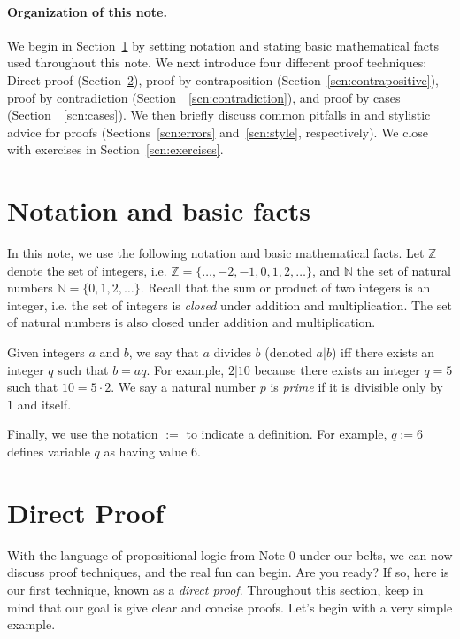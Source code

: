 \documentclass[11pt]{article}
\begin{document}
\paragraph{Organization of this note.} We begin in Section~\ref{scn:facts} by setting notation and stating basic mathematical facts used throughout this note. We next introduce four different proof techniques: Direct proof (Section~\ref{scn:direct}), proof by contraposition (Section~\ref{scn:contrapositive}), proof by contradiction (Section~~\ref{scn:contradiction}), and proof by cases (Section~~\ref{scn:cases}). We then briefly discuss common pitfalls in and stylistic advice for proofs (Sections~\ref{scn:errors} and~\ref{scn:style}, respectively). We close with exercises in Section~\ref{scn:exercises}.

\section{Notation and basic facts}\label{scn:facts}
In this note, we use the following notation and basic mathematical facts. Let $\mathbb{Z}$ denote the set of integers, i.e. $\mathbb{Z}=\{\ldots,-2,-1,0,1,2,\ldots\}$, and $\mathbb{N}$ the set of natural numbers $\mathbb{N}=\{0,1,2,\ldots\}$. Recall that the sum or product of two integers is an integer, i.e. the set of integers is \emph{closed} under addition and multiplication. The set of natural numbers is also closed under addition and multiplication.

Given integers $a$ and $b$, we say that $a$ divides $b$ (denoted $a | b$) iff there exists an integer $q$ such that $b=aq$. For example, $2 | 10$ because there exists an integer $q=5$ such that $10=5\cdot 2$. We say a natural number $p$ is \emph{prime} if it is divisible only by $1$ and itself. 

Finally, we use the notation $:=$ to indicate a definition. For example, $q:=6$ defines variable $q$ as having value $6$.

\section{Direct Proof}\label{scn:direct}

With the language of propositional logic from Note 0 under our belts, we can now discuss proof techniques, and the real fun can begin. Are you ready? If so, here is our first technique, known as a \emph{direct proof}. Throughout this section, keep in mind that our goal is give clear and concise proofs. Let's begin with a very simple example.
\end{document}
